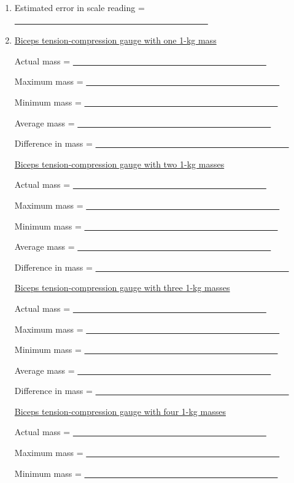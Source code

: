 \begin{enumerate}[label=\arabic*.]

\item Estimated error in scale reading = \ul{~~~~~~~~~~~~~~~~~~~~~~~~~~~~~~~~~~~~~~~~~~~~~}

\item \ul{Biceps tension-compression gauge with one 1-kg mass}

Actual mass = \ul{~~~~~~~~~~~~~~~~~~~~~~~~~~~~~~~~~~~~~~~~~~~~~}

Maximum mass = \ul{~~~~~~~~~~~~~~~~~~~~~~~~~~~~~~~~~~~~~~~~~~~~~}

Minimum mass = \ul{~~~~~~~~~~~~~~~~~~~~~~~~~~~~~~~~~~~~~~~~~~~~~}

Average mass = \ul{~~~~~~~~~~~~~~~~~~~~~~~~~~~~~~~~~~~~~~~~~~~~~}

Difference in mass = \ul{~~~~~~~~~~~~~~~~~~~~~~~~~~~~~~~~~~~~~~~~~~~~~}

\ul{Biceps tension-compression gauge with two 1-kg masses}

Actual mass = \ul{~~~~~~~~~~~~~~~~~~~~~~~~~~~~~~~~~~~~~~~~~~~~~}

Maximum mass = \ul{~~~~~~~~~~~~~~~~~~~~~~~~~~~~~~~~~~~~~~~~~~~~~}

Minimum mass = \ul{~~~~~~~~~~~~~~~~~~~~~~~~~~~~~~~~~~~~~~~~~~~~~}

Average mass = \ul{~~~~~~~~~~~~~~~~~~~~~~~~~~~~~~~~~~~~~~~~~~~~~}

Difference in mass = \ul{~~~~~~~~~~~~~~~~~~~~~~~~~~~~~~~~~~~~~~~~~~~~~}

\ul{Biceps tension-compression gauge with three 1-kg masses}

Actual mass = \ul{~~~~~~~~~~~~~~~~~~~~~~~~~~~~~~~~~~~~~~~~~~~~~}

Maximum mass = \ul{~~~~~~~~~~~~~~~~~~~~~~~~~~~~~~~~~~~~~~~~~~~~~}

Minimum mass = \ul{~~~~~~~~~~~~~~~~~~~~~~~~~~~~~~~~~~~~~~~~~~~~~}

Average mass = \ul{~~~~~~~~~~~~~~~~~~~~~~~~~~~~~~~~~~~~~~~~~~~~~}

Difference in mass = \ul{~~~~~~~~~~~~~~~~~~~~~~~~~~~~~~~~~~~~~~~~~~~~~}

\ul{Biceps tension-compression gauge with four 1-kg masses}

Actual mass = \ul{~~~~~~~~~~~~~~~~~~~~~~~~~~~~~~~~~~~~~~~~~~~~~}

Maximum mass = \ul{~~~~~~~~~~~~~~~~~~~~~~~~~~~~~~~~~~~~~~~~~~~~~}

Minimum mass = \ul{~~~~~~~~~~~~~~~~~~~~~~~~~~~~~~~~~~~~~~~~~~~~~}


\end{enumerate}
